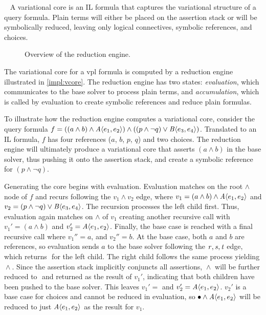 ~\label{section:vsat:vcore}
%
A variational core is an IL formula that captures the variational structure of
a query formula. Plain terms will either be placed on the assertion stack or
will be symbolically reduced, leaving only logical connectives, symbolic
references, and choices.

\begin{figure}
  \centering
    
    \caption{Overview of the reduction engine.}%
    \label{impl:vcore}
\end{figure}


The variational core for a \ac{vpl} formula is computed by a reduction engine
illustrated in \autoref{impl:vcore}. The reduction engine has two states:
\emph{evaluation}, which communicates to the base solver to process plain terms,
and \emph{accumulation}, which is called by evaluation to create symbolic
references and reduce plain formulas.


To illustrate how the reduction engine computes a variational core, consider the
query formula $f = ((a \wedge b) \wedge \chc[A]{e_{1}, e_{2}}) \wedge ((p \wedge
\neg q) \vee \chc[B]{e_{3}, e_{4}})$. Translated to an IL formula, $f$ has four
references ($a$, $b$, $p$, $q$) and two choices. The reduction engine will
ultimately produce a variational core that asserts $(a \wedge b)$ in the base
solver, thus pushing it onto the assertion stack, and create a symbolic
reference for $(p \wedge \neg q)$.

Generating the core begins with evaluation. Evaluation matches on the root
$\wedge$ node of $f$ and recurs following the $v_1 \wedge v_2$ edge, where
%
$v_1=(a\wedge b)\wedge\chc[A]{e_1,e_2}$ and
$v_2=(p\wedge \neg q) \vee \chc[B]{e_3, e_4}$.
%
The recursion processes the left child first. Thus, evaluation again matches on
$\wedge$ of $v_{1}$ creating another recursive call with $v_{1}' = (a\wedge b)$
and $v_{2}' = \chc[A]{e_1,e_2}$. Finally, the base case is reached with a final
recursive call where $v_{1}'' = a$, and $v_{2}'' = b$. At the base case, both
$a$ and $b$ are references, so evaluation sends $a$ to the base solver
following the $\mathit{r, s, t}$ edge, which returns $\unit{}$ for the left child.
The right child follows the same process yielding $\unit{} \wedge \unit{}$.
Since the assertion stack implicitly conjuncts all assertions, $\unit{} \wedge
\unit{}$ will be further reduced to $\unit{}$ and returned as the result of
$v_{1}'$, indicating that both children have been pushed to the base solver.
This leaves $v_{1}' = \unit{}$ and $v_{2}' = \chc[A]{e_1,e_2}$. $v_{2}'$ is a
base case for choices and cannot be reduced in evaluation, so $\unit{} \wedge
\chc[A]{e_1,e_2}$ will be reduced to just $\chc[A]{e_1,e_2}$ as the result for
$v_{1}$.


